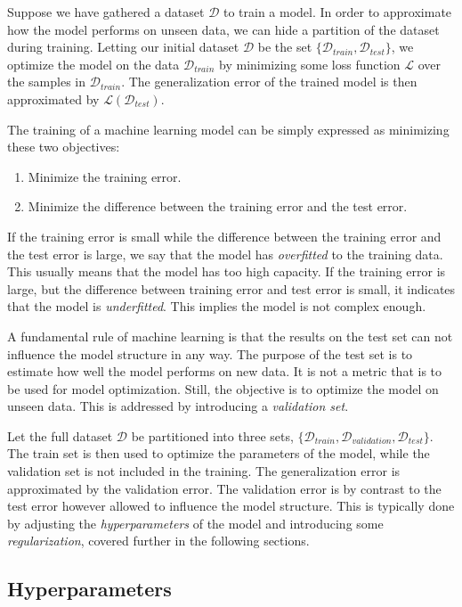 Suppose we have gathered a dataset $\mathcal{D}$ to train a model. In order to approximate how the model performs on unseen data, we can hide a partition of the dataset during training. Letting our initial dataset $\mathcal{D}$ be the set $\{\mathcal{D}_{train}, \mathcal{D}_{test}\}$, we optimize the model on the data $\mathcal{D}_{train}$ by minimizing some loss function $\mathcal{L}$ over the samples in $\mathcal{D}_{train}$. The generalization error of the trained model is then approximated by $\mathcal{L}(\mathcal{D}_{test})$.

The training of a machine learning model can be simply expressed as minimizing these two objectives:
\begin{enumerate}
    \item Minimize the training error.
    \item Minimize the difference between the training error and the test error. 
\end{enumerate}

If the training error is small while the difference between the training error and the test error is large, we say that the model has \emph{overfitted} to the training data. This usually means that the model has too high capacity. If the training error is large, but the difference between training error and test error is small, it indicates that the model is \emph{underfitted}. This implies the model is not complex enough.  


A fundamental rule of machine learning is that the results on the test set can not influence the model structure in any way. The purpose of the test set is to estimate how well the model performs on new data. It is not a metric that is to be used for model optimization. Still, the objective is to optimize the model on unseen data. This is addressed by introducing a \emph{validation set}. 

Let the full dataset $\mathcal{D}$ be partitioned into three sets, $\{\mathcal{D}_{train}, \mathcal{D}_{validation}, \mathcal{D}_{test} \}$. The train set is then used to optimize the parameters of the model, while the validation set is not included in the training. The generalization error is approximated by the validation error. The validation error is by contrast to the test error however allowed to influence the model structure. This is typically done by adjusting the \emph{hyperparameters} of the model and introducing some \emph{regularization}, covered further in the following sections. 

\subsection{Hyperparameters}\label{sec:hyper}

